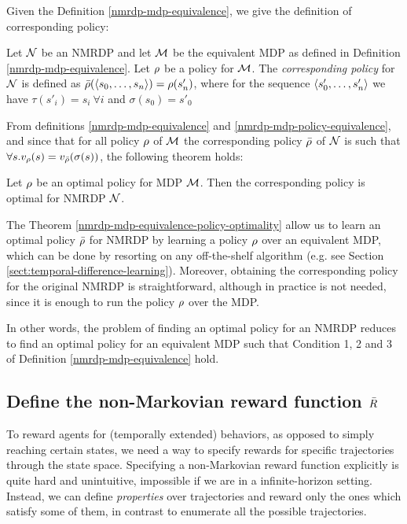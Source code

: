 Given the Definition \ref{nmrdp-mdp-equivalence}, we give the definition of corresponding policy:
\begin{definition}\label{nmrdp-mdp-policy-equivalence}
	Let $\mathcal{N}$ be an NMRDP and let $\mathcal{M}$ be the equivalent MDP as defined in Definition \ref{nmrdp-mdp-equivalence}.
	Let $\rho$ be  a  policy  for $\mathcal{M}$. The 
	\emph{corresponding policy} for $\mathcal{N}$ is  defined  as 
	$\bar{\rho}(\langle s_0, \dots, s_n \rangle) = \rho(s'_n) $,   where for the sequence $\langle s'_0, \dots, s'_n \rangle$ we have $\tau(s'_i) = s_i\ \forall i$ and $\sigma(s_0)=s'_0$
\end{definition}
From definitions \ref{nmrdp-mdp-equivalence} and 
\ref{nmrdp-mdp-policy-equivalence}, and since that for all 
policy $\rho$ of $\mathcal{M}$ the corresponding policy 
$\bar{\rho}$ of $\mathcal{N}$ is such that $ \forall s. v_\rho(s) = v_{\bar{\rho}}(\sigma(s))$, the following theorem holds:
\begin{theorem}\label{nmrdp-mdp-equivalence-policy-optimality}
	Let $\rho$ be an  optimal policy for MDP $\mathcal{M}$. Then the corresponding policy is optimal for NMRDP $\mathcal{N}$.
\end{theorem}

The Theorem \ref{nmrdp-mdp-equivalence-policy-optimality} allow us to learn an optimal policy $\bar{\rho}$ for NMRDP by learning a policy $\rho$ over an equivalent MDP, which can be done by resorting on  any off-the-shelf algorithm (e.g. see Section \ref{sect:temporal-difference-learning}). Moreover, obtaining the corresponding policy for the original NMRDP is straightforward, although in practice is not needed, since it is enough to run the policy $\rho$ over the MDP.

In other words, the problem of finding an optimal policy for an NMRDP reduces to find an optimal policy for an equivalent MDP such that Condition 1, 2 and 3 of Definition \ref{nmrdp-mdp-equivalence} hold.


\subsection{Define the non-Markovian reward function $\bar{R}$}
To  reward  agents  for  (temporally  extended)
behaviors, as opposed to simply reaching certain states, we need a way
to specify rewards for specific trajectories through the state
space. 
Specifying a non-Markovian reward function explicitly is quite hard and unintuitive, impossible if we are in a infinite-horizon setting. 
Instead, we can define \emph{properties} over trajectories and reward only the ones which satisfy some of them, in contrast to enumerate all the possible trajectories.

